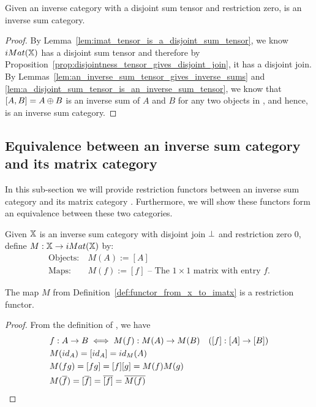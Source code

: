 \begin{theorem}\label{thm:imatx_is_an_inverse_sum_category}
  Given \X an inverse category with a disjoint sum tensor and restriction zero, \imatx is
  an inverse sum category.
\end{theorem}
\begin{proof}
  By Lemma~\ref{lem:imat_tensor_is_a_disjoint_sum_tensor}, we know $iMat({\mathbb{X}})$ has a disjoint sum
  tensor and therefore by Proposition~\ref{prop:disjointness_tensor_gives_disjoint_join},
  it has a disjoint join. By Lemmas~\ref{lem:an_inverse_sum_tensor_gives_inverse_sums} and
  \ref{lem:a_disjoint_sum_tensor_is_an_inverse_sum_tensor}, we know that $[A,B] = A\oplus B$ is
  an inverse sum of $A$ and $B$ for any two objects in \imatx, and hence, \imatx is an inverse
  sum category.
\end{proof}

\subsection{Equivalence between an inverse sum category and its matrix category} %
\label{sub:equivalence_between_an_inverse_sum_category_and_its_matrix_category}
In this sub-section we will provide restriction functors between an inverse sum category
\X and its matrix category \imatx. Furthermore, we will show these functors form an
equivalence between these two categories.

\begin{definition}\label{def:functor_from_x_to_imatx}
  Given $\mathbb{X}$ is an inverse sum category with disjoint join $\perp$ and restriction zero $0$,
  define $M:\mathbb{X} \to iMat({\mathbb{X}})$ by:
  \begin{align*}
    \text{Objects:}\ &M(A) := [A]\\
    \text{Maps:}\ &M(f) := [f] \text{ -- The }1\times1\text{ matrix with entry }f.
  \end{align*}
\end{definition}
\begin{lemma}\label{lem:m_is_a_functor}
  The map $M$ from Definition~\ref{def:functor_from_x_to_imatx} is a restriction functor.
\end{lemma}
\begin{proof}
  From the definition of \imatx, we have
  \begin{align*}
    &f: A\to B  \iff M(f):M(A)\to M(B)\quad ([f]: [A]\to [B])\\
    &M(id_A)  = [id_{A}] = id_M(A)\\
    &M(f g) = [f g] = [f][g] = M(f) M(g)\\
    &M(\overline{f}) = [\overline{f}] = \overline{[f]} = \overline{M(f)}
  \end{align*}
\end{proof}

